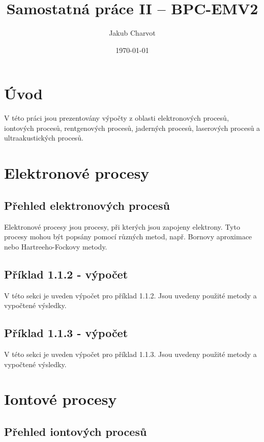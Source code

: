 \documentclass{article}
\begin{document}
\title{Samostatná práce II – BPC-EMV2}
\author{Jakub Charvot}
\date{\czdate\today}
\maketitle

\section{Úvod}

V této práci jsou prezentovány výpočty z oblasti elektronových procesů, iontových procesů, rentgenových procesů, jaderných procesů, laserových procesů a ultraakustických procesů.

\section{Elektronové procesy}

\subsection{Přehled elektronových procesů}

Elektronové procesy jsou procesy, při kterých jsou zapojeny elektrony. Tyto procesy mohou být popsány pomocí různých metod, např. Bornovy aproximace nebo Hartreeho-Fockovy metody.

\subsection{Příklad 1.1.2 - výpočet}

V této sekci je uveden výpočet pro příklad 1.1.2. Jsou uvedeny použité metody a vypočtené výsledky.

\subsection{Příklad 1.1.3 - výpočet}

V této sekci je uveden výpočet pro příklad 1.1.3. Jsou uvedeny použité metody a vypočtené výsledky.

\section{Iontové procesy}

\subsection{Přehled iontových procesů}
\end{document}
